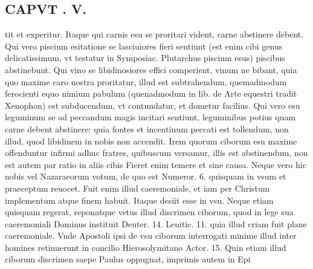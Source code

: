 \documentclass{article}
\begin{document}
\begin{pages}
\section*{CAPVT . V. }
\marginpar{[ p.277 ]}\pstart tit et experitur. Itaque qui carnis esu se proritari vident, carne abstinere debent. Qui vero piscium esitatione se lasciuiores fieri sentiunt (est enim cibi genus delicatissimum, vt testatur in Symposiac. Plutarchus piscium esus) piscibus abstinebunt. Qui vino se libidinosiores effici comperient, vinum ne bibant, quia quo maxime caro nostra proritatur, illud est subtrahendum, quemadmodum ferocienti equo nimium pabulum (quenadmodum in lib.  de Arte equestri tradit Xenophon) est subducendum, vt contundatur, et dometur facilius. Qui vero esu leguminum se ad peccandum magis incitari sentiunt, leguminibus potius quam carne debent abstinere: quia fontes et incentiuum peccati est tollendum, non illud, quod libidinem in nobis non accendit. Irem quorum ciborum esu maxime offenduntur infirmi adhuc fratres, quibuscum versamur, illis est abstinendum, non est autem par ratio in aliis cibis Fieret enim temere et sine causa. Neque vero hic nobis vel Nazaraeorum votum, de quo est Numeror. 6. quisquam in vsum et praeceptum reuocet. Fuit enim illud caeremoniale, et iam per Christum implementum atque finem habuit. Itaque desiit esse in vsu. Neque etiam quisquam regerat, reponatque vetus illud discrimen ciborum, quod in lege sua caeremoniali Dominus instituit Deuter. 14. Leuitic. 11. quia illud criam fuit plane caeremoniale. Vnde Apostoli ipsi de vsu ciborum interrogati minime illud inter homines retinuerunt in concilio Hierosolymitano Actor. 15. Quin etiam illud ciborum discrimen saepe Paulus oppugnat, imprimis autem in Epi\pend

\end{pages}
\end{document}
